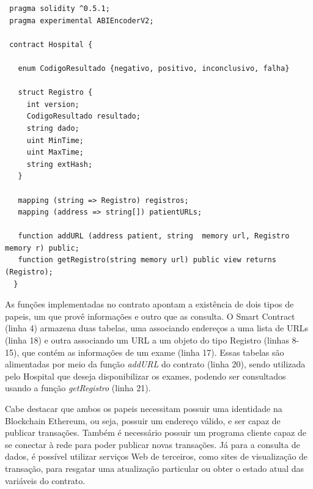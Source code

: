 \documentclass[a4paper,11pt]{article}
\begin{document}
\begin{lstlisting}
 pragma solidity ^0.5.1;
 pragma experimental ABIEncoderV2;

 contract Hospital {

   enum CodigoResultado {negativo, positivo, inconclusivo, falha}

   struct Registro {
     int version;
     CodigoResultado resultado;
     string dado;
     uint MinTime;
     uint MaxTime;
     string extHash;
   }

   mapping (string => Registro) registros;
   mapping (address => string[]) patientURLs;

   function addURL (address patient, string  memory url, Registro memory r) public;
   function getRegistro(string memory url) public view returns (Registro);
  }
\end{lstlisting}


As funções implementadas no contrato apontam a existência de dois tipos de papeis, um que provê informações e outro que as consulta.
O Smart Contract (linha 4) armazena duas tabelas, uma associando endereços a uma lista de URLs (linha 18) e outra associando um URL a um objeto do tipo Registro (linhas 8-15), que contém as informações de um exame (linha 17).
Essas tabelas são alimentadas por meio da função \emph{addURL} do contrato (linha 20), sendo utilizada pelo Hospital que deseja disponibilizar os exames, podendo ser consultados usando a função \emph{getRegistro} (linha 21).

Cabe destacar que ambos os papeis necessitam possuir uma identidade na Blockchain Ethereum, ou seja, possuir um endereço válido, e ser capaz de publicar transações. Também é necessário possuir um programa cliente capaz de se conectar à rede para poder publicar novas transações.
Já para a consulta de dados, é possível utilizar serviços Web de terceiros, como sites de visualização de transação, para resgatar uma atualização particular ou obter o estado atual das variáveis do contrato.
\end{document}
